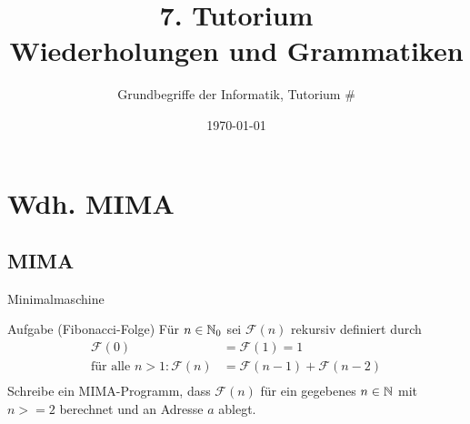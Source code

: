 




\title[Short Title]{7. Tutorium\\ Wiederholungen und Grammatiken}
\subtitle{Grundbegriffe der Informatik, Tutorium \#\mytutnumber}
\date{\today}


\titleframe
\roadmap

\section{Wdh. MIMA}
\subsection{MIMA}
\begin{frame}{Minimalmaschine}
	\begin{exampleblock}{Aufgabe (Fibonacci-Folge)}
		Für $n \in \mathbb{N}_0$ sei $\mathcal{F}(n)$ rekursiv definiert durch\\
		\begin{align*}
			 \mathcal{F}(0) &=  \mathcal{F}(1) = 1\\
			\text{für alle }n>1: \mathcal{F}(n) &= \mathcal{F}(n-1) + \mathcal{F}(n-2)\\
		\end{align*}
		Schreibe ein MIMA-Programm, dass $\mathcal{F}(n)$ für ein gegebenes $n \in \mathbb{N}$ mit $n>=2$ berechnet und an Adresse $a$ ablegt.
	\end{exampleblock}
\end{frame}
	
